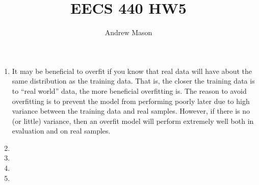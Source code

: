 \documentclass[12pt]{article}
\title{EECS 440 HW5}
\author{Andrew Mason}
\begin{document}
\maketitle

\begin{enumerate}
  \item
    It may be beneficial to overfit if you know that real data will have about
    the same distribution as the training data. That is, the closer the
    training data is to ``real world'' data, the more beneficial overfitting
    is. The reason to avoid overfitting is to prevent the model from performing
    poorly later due to high variance between the training data and real
    samples. However, if there is no (or little) variance, then an overfit
    model will perform extremely well both in evaluation and on real samples.\\
  \item
  \item
  \item
  \item
\end{enumerate}
\end{document}
